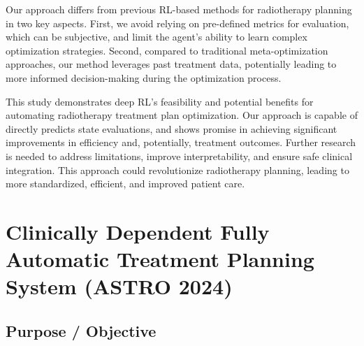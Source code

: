 Our approach differs from previous RL-based methods for radiotherapy planning in two key aspects.
First, we avoid relying on pre-defined metrics for evaluation, which can be subjective, and limit the agent's ability to learn complex optimization strategies.
Second, compared to traditional meta-optimization approaches, our method leverages past treatment data, potentially leading to more informed decision-making during the optimization process.

This study demonstrates deep RL's feasibility and potential benefits for automating radiotherapy treatment plan optimization.
Our approach is capable of directly predicts state evaluations, and shows promise in achieving significant improvements in efficiency and, potentially, treatment outcomes.
Further research is needed to address limitations, improve interpretability, and ensure safe clinical integration.
This approach could revolutionize radiotherapy planning, leading to more standardized, efficient, and improved patient care.






\section{Clinically Dependent Fully Automatic Treatment Planning System (ASTRO 2024)}
\subsection{Purpose / Objective}

